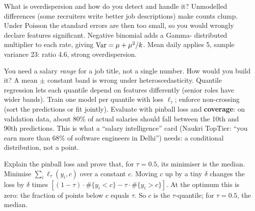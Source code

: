 \begin{qa}{What is overdispersion and how do you detect and handle it?}
\why Unmodelled differences (some recruiters write better job descriptions) make counts clump. Under Poisson the
standard errors are then too small, so you would wrongly declare features significant. Negative binomial adds a Gamma-
distributed multiplier to each rate, giving $\operatorname{Var} = \mu + \mu^2/k$.
\worked Mean daily applies 5, sample variance 23: ratio 4.6, strong overdispersion.
\end{qa}

\begin{qa}{\deep You need a salary \emph{range} for a job title, not a single number. How would you build it?}
\why A mean $\pm$ constant band is wrong under heteroscedasticity. Quantile regression lets each quantile depend on features
differently (senior roles have wider bands). Train one model per quantile with loss $\ell_\tau$; enforce non-crossing (sort
the predictions or fit jointly). Evaluate with pinball loss and \textbf{coverage}: on validation data, about 80\% of actual
salaries should fall between the 10th and 90th predictions.
\inpractice This is what a ``salary intelligence'' card (Naukri TopTier: ``you earn more than 68\% of software engineers in
Delhi'') needs: a conditional distribution, not a point.
\end{qa}

\begin{qa}{Explain the pinball loss and prove that, for $\tau = 0.5$, its minimiser is the median.}
\why Minimise $\sum_i\ell_\tau(y_i, c)$ over a constant $c$. Moving $c$ up by a tiny $\delta$ changes the loss by $\delta$
times $[(1-\tau)\cdot\#\{y_i < c\} - \tau\cdot\#\{y_i > c\}]$. At the optimum this is zero: the fraction of points below
$c$ equals $\tau$. So $c$ is the $\tau$-quantile; for $\tau = 0.5$, the median.
\end{qa}

